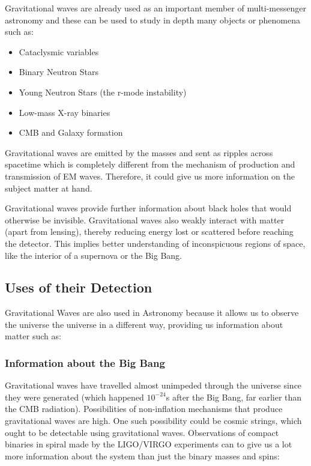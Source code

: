 \hspace{1cm}Gravitational waves are already used as an important member of multi-messenger astronomy and these can be used to study in depth many objects or phenomena such as:

\begin{itemize}

\item Cataclysmic variables
\item Binary Neutron Stars
\item Young Neutron Stars (the r-mode instability)
\item Low-mass X-ray binaries
\item CMB and Galaxy formation

\end{itemize}

\hspace{1cm}Gravitational waves are emitted by the masses and sent as ripples across spacetime which is completely different from the mechanism of production and transmission of EM waves. Therefore, it could give us more information on the subject matter at hand.

\hspace{1cm}Gravitational waves provide further information about black holes that would otherwise be invisible. Gravitational waves also weakly interact with matter (apart from lensing), thereby reducing energy lost or scattered before reaching the detector. This implies better understanding of inconspicuous regions of space, like the interior of a supernova or the Big Bang.

\subsection{Uses of their Detection}

\hspace{1cm} Gravitational Waves are also used in Astronomy because it allows us to observe the universe the universe in a different way, providing us information about matter such as:

\subsubsection{Information about the Big Bang}
\hspace{1cm}Gravitational waves have travelled almost unimpeded through the universe since they were generated (which happened $10^{-24}$s after the Big Bang, far earlier than the CMB radiation). Possibilities of non-inflation mechanisms that produce gravitational waves are high. One such possibility could be cosmic strings, which ought to be detectable using gravitational waves. Observations of compact binaries in spiral made by the LIGO/VIRGO experiments can to give us a lot more information about the system than just the binary masses and spins:

